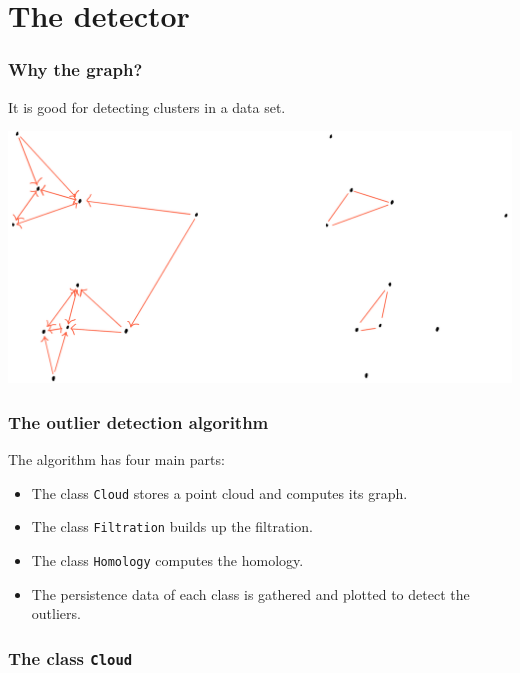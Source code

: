 \documentclass{beamer}
\begin{document}
\section{The detector}
\begin{frame}
	\frametitle{Why the \MKNN graph?}
	It is good for detecting clusters in a data set. 
	\begin{center}
		\includegraphics[width=\textwidth]{drawings/mknn}
	\end{center}
\end{frame}

\begin{frame}
	\frametitle{The outlier detection algorithm}
	The algorithm has four main parts: \pause
	\begin{itemize}
		\item The class \texttt{Cloud} stores a point cloud and computes its \MKNN graph.
			\pause
		\item The class \texttt{Filtration} builds up the filtration. \pause
		\item The class \texttt{Homology} computes the homology. \pause
		\item The persistence data of each class is gathered and plotted to detect the
			outliers. 
	\end{itemize}
\end{frame}

\begin{frame}
	\frametitle{The class \texttt{Cloud}}
	
\end{frame}
\end{document}
